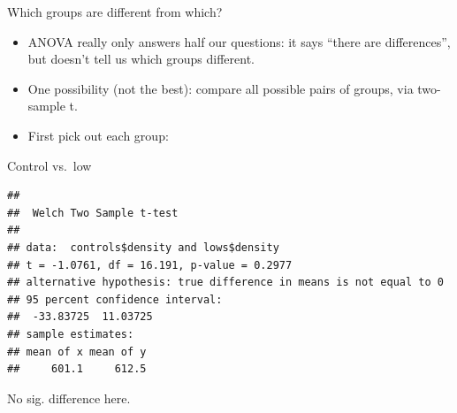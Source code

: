 \documentclass[
  ignorenonframetext,
]{beamer}
\newenvironment{Shaded}{\begin{snugshade}}{\end{snugshade}}
\newcommand{\KeywordTok}[1]{\textcolor[rgb]{0.13,0.29,0.53}{\textbf{#1}}}
\newcommand{\NormalTok}[1]{#1}
\newcommand{\OperatorTok}[1]{\textcolor[rgb]{0.81,0.36,0.00}{\textbf{#1}}}
\newcommand{\StringTok}[1]{\textcolor[rgb]{0.31,0.60,0.02}{#1}}
\providecommand{\tightlist}{%
  \setlength{\itemsep}{0pt}\setlength{\parskip}{0pt}}
\begin{document}
\begin{frame}[fragile]{Which groups are different from which?}
\protect\hypertarget{which-groups-are-different-from-which}{}

\begin{itemize}
\tightlist
\item
  ANOVA really only answers half our questions: it says ``there are
  differences'', but doesn't tell us which groups different.
\item
  One possibility (not the best): compare all possible pairs of groups,
  via two-sample t.
\item
  First pick out each group:
\end{itemize}

\begin{Shaded}
\end{Shaded}

\end{frame}

\begin{frame}[fragile]{Control vs.~low}
\protect\hypertarget{control-vs.-low}{}

\begin{Shaded}
\end{Shaded}

\begin{verbatim}
## 
##  Welch Two Sample t-test
## 
## data:  controls$density and lows$density
## t = -1.0761, df = 16.191, p-value = 0.2977
## alternative hypothesis: true difference in means is not equal to 0
## 95 percent confidence interval:
##  -33.83725  11.03725
## sample estimates:
## mean of x mean of y 
##     601.1     612.5
\end{verbatim}

No sig. difference here.

\end{frame}
\end{document}
